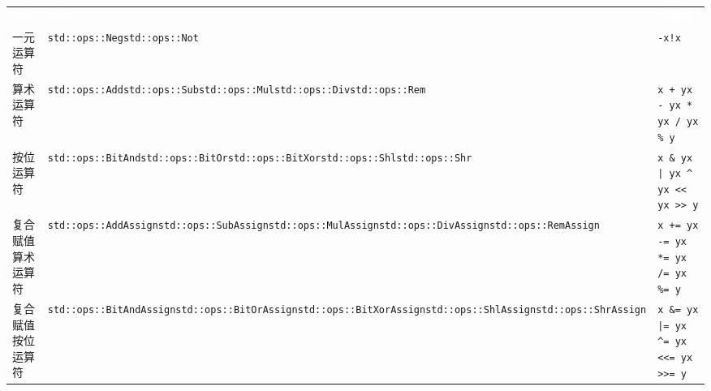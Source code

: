 \myTableBegin
\begin{tabularx}{\textwidth}{@{}>{\hsize=0.371\hsize\raggedright\arraybackslash}X>{\hsize=1.315\hsize\raggedright\arraybackslash}X>{\hsize=1.315\hsize\raggedright\arraybackslash}X@{}}
\rowcolor{tabhead}\textcolor{white}{类别} & \textcolor{white}{特型} & \textcolor{white}{运算符} \\
一元运算符 & \texttt{std::ops::Neg}\newline{}\texttt{std::ops::Not} & \texttt{-x}\newline{}\texttt{!x} \\
算术运算符 & \texttt{std::ops::Add}\newline{}\texttt{std::ops::Sub}\newline{}\texttt{std::ops::Mul}\newline{}\texttt{std::ops::Div}\newline{}\texttt{std::ops::Rem} & \texttt{x + y}\newline{}\texttt{x - y}\newline{}\texttt{x * y}\newline{}\texttt{x / y}\newline{}\texttt{x \% y} \\
按位运算符 & \texttt{std::ops::BitAnd}\newline{}\texttt{std::ops::BitOr}\newline{}\texttt{std::ops::BitXor}\newline{}\texttt{std::ops::Shl}\newline{}\texttt{std::ops::Shr} & \texttt{x \& y}\newline{}\texttt{x | y}\newline{}\texttt{x \textasciicircum{} y}\newline{}\texttt{x << y}\newline{}\texttt{x >> y} \\
复合赋值算术运算符 & \texttt{std::ops::AddAssign}\newline{}\texttt{std::ops::SubAssign}\newline{}\texttt{std::ops::MulAssign}\newline{}\texttt{std::ops::DivAssign}\newline{}\texttt{std::ops::RemAssign} & \texttt{x += y}\newline{}\texttt{x -= y}\newline{}\texttt{x *= y}\newline{}\texttt{x /= y}\newline{}\texttt{x \%= y} \\
复合赋值按位运算符 & \texttt{std::ops::BitAndAssign}\newline{}\texttt{std::ops::BitOrAssign}\newline{}\texttt{std::ops::BitXorAssign}\newline{}\texttt{std::ops::ShlAssign}\newline{}\texttt{std::ops::ShrAssign} & \texttt{x \&= y}\newline{}\texttt{x |= y}\newline{}\texttt{x \textasciicircum{}= y}\newline{}\texttt{x <<= y}\newline{}\texttt{x >>= y} \\

\end{tabularx}
